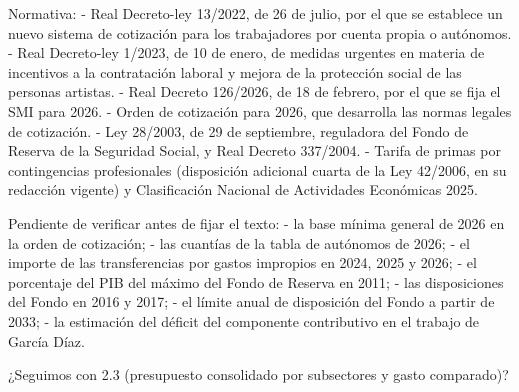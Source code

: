 \documentclass[10pt,a4paper]{article}
\begin{document}
Normativa:
- Real Decreto-ley 13/2022, de 26 de julio, por el que se establece un nuevo sistema de cotización para los trabajadores por cuenta propia o autónomos.
- Real Decreto-ley 1/2023, de 10 de enero, de medidas urgentes en materia de incentivos a la contratación laboral y mejora de la protección social de las personas artistas.
- Real Decreto 126/2026, de 18 de febrero, por el que se fija el SMI para 2026.
- Orden de cotización para 2026, que desarrolla las normas legales de cotización.
- Ley 28/2003, de 29 de septiembre, reguladora del Fondo de Reserva de la Seguridad Social, y Real Decreto 337/2004.
- Tarifa de primas por contingencias profesionales (disposición adicional cuarta de la Ley 42/2006, en su redacción vigente) y Clasificación Nacional de Actividades Económicas 2025.

Pendiente de verificar antes de fijar el texto:
- la base mínima general de 2026 en la orden de cotización;
- las cuantías de la tabla de autónomos de 2026;
- el importe de las transferencias por gastos impropios en 2024, 2025 y 2026;
- el porcentaje del PIB del máximo del Fondo de Reserva en 2011;
- las disposiciones del Fondo en 2016 y 2017;
- el límite anual de disposición del Fondo a partir de 2033;
- la estimación del déficit del componente contributivo en el trabajo de García Díaz.

¿Seguimos con 2.3 (presupuesto consolidado por subsectores y gasto comparado)?
\end{document}

